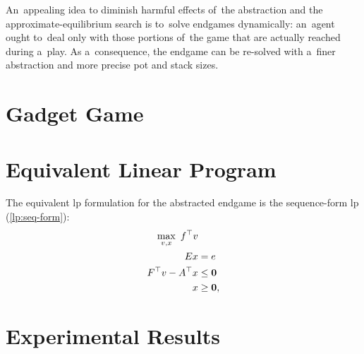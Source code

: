 An~appealing idea to diminish harmful effects of~the abstraction and the approximate-equilibrium search is to~solve endgames dynamically:
an~agent ought to~deal only with those portions of~the game that are actually reached during a~play.
As a~consequence, the endgame can be re-solved with a~finer abstraction and more precise pot and stack sizes.
\todo

\section{Gadget Game}

\section{Equivalent Linear Program}
\todo

The equivalent \acrshort{lp} formulation for the abstracted endgame is the sequence-form \acrshort{lp} (\ref{lp:seq-form}):
\begin{equation*}
  \begin{split}
    \max_{v, x}\  f^\top v & \\
    Ex &= e \\
    F^\top v - A^\top x &\le \boldsymbol{0} \\
    x &\ge \boldsymbol{0},
  \end{split}
\end{equation*}

\section{Experimental Results}

